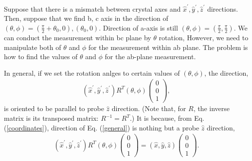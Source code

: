 Suppose that there is a mismatch between crystal axes and $\hat{x}^\prime, \hat{y}^\prime, \hat{z}^\prime$ directions.
Then, suppose that we find b, c axis in the direction of $(\theta,\phi) = (\frac{\pi}{2}+\theta_0,0), (\theta_0,0)$.
Direction of a-axis is still $(\theta,\phi) = (\frac{\pi}{2}, \frac{\pi}{2})$.
We can conduct the measurement within bc plane by $\theta$ rotation,
However, we need to manipulate both of $\theta$ and $\phi$ for the measurement within ab plane.
The problem is how to find the values of $\theta$ and $\phi$ for the ab-plane measurement.

In general, if we set the rotation anlges to certain values of $(\theta,\phi)$, the direction,
\begin{align}
\label{general}
(\hat{x}^\prime, \hat{y}^\prime, \hat{z}^\prime) R^T (\theta, \phi)
\left(
\begin{array}{c}
0 \\
0 \\
1
\end{array}
\right),
\end{align}
is oriented to be parallel to probe $\hat{z}$ direction.
(Note that, for $R$, the inverse matrix is its transposed matrix: $R^{-1} = R^T$.)
It is because, from Eq. (\ref{coordinates}), direction of Eq. (\ref{general}) is nothing but a probe $\hat{z}$ direction,
\begin{align}
(\hat{x}^\prime, \hat{y}^\prime, \hat{z}^\prime) R^T (\theta, \phi)
\left(
\begin{array}{c}
0 \\
0 \\
1
\end{array}
\right)
= (\hat{x}, \hat{y}, \hat{z})
\left(
\begin{array}{c}
0 \\
0 \\
1
\end{array}
\right).
\end{align}

